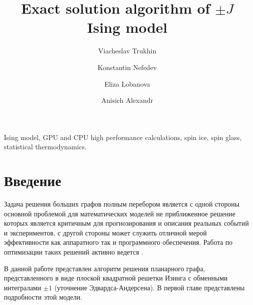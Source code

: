 \documentclass[utf8, babel, sor, jor, amsmath, amssymb, reprint]{elsarticle} %
\begin{document}
	
	\begin{frontmatter}
		
		
		\title{Exact solution algorithm of $\pm J$ Ising model}
		
		\author[mainaddress, secondaryaddress]{Viacheslav Trukhin}
		
		\author[mainaddress, secondaryaddress]{Konstantin Nefedev}
		
		\author[mainaddress, secondaryaddress]{Eliza Lobanova}
		
		\author[mainaddress, secondaryaddress]{Anisich Alexandr}
		
		\address[mainaddress]{Far Eastern Federal University, Vladivostok, Russky Island, 10 Ajax Bay, 690922, the Russian Federation}
		\address[secondaryaddress]{Institute of Applied Mathematics, Far Eastern Branch, Russian Academy of Science, Vladivostok, Radio 7, 690041, the Russian Federation}
		
		\begin{abstract}
			
			
		\end{abstract}
		
		
		\begin{keyword}
			Ising model, GPU and CPU high performance calculations, spin ice, spin glass, statistical thermodynamics.
			
		\end{keyword}
		
		
	\end{frontmatter}
	
	\linenumbers
	\newpage
	\tableofcontents
	
	\newpage
	\section*{Введение}
	
	Задача решения больших графов полным перебором является с одной стороны основной проблемой для математических моделей не приближенное решение которых является критичным для прогнозирования и описания реальных событий и экспериментов, с другой стороны может служить отличной мерой эффективности как аппаратного так и программного обеспечения. Работа по оптимизации таких решений активно ведется \cite{romero2020high}. 
	
	В данной работе представлен алгоритм решения планарного графа, представленного в виде плоской квадратной решетки Изинга с обменными интегралами $\pm 1$ (уточнение Эдвардса-Андерсена). В первой главе представлены подробности этой модели.
	
\end{document}
